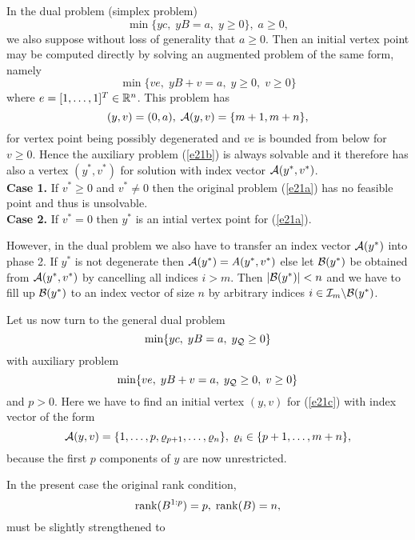 In the dual problem (simplex problem)
\begin{equation} \label{e21a}
\min\{yc, \; yB = a, \; y \geq 0\}, \; a \geq 0,
\end{equation}
we also suppose without loss of generality that $a \geq 0$.  Then an initial
vertex point may be computed directly by solving an augmented problem of the
same form, namely
%
\begin{equation} \label{e21b}
\min \{ve, \; yB + v = a, \; y \geq 0, \; v \geq 0\}
\end{equation}
%
where $e = [1, \ldots , 1]^T \in \Bbb{R}^n$.  This problem has
\[
(y,v) = (0,a), \; {\cal A}(y,v) = \{m+1,m+n\},
\]
for vertex point being possibly degenerated and $ve$ is bounded from
below for $v \geq 0$.  Hence the auxiliary problem (\ref{e21b}) is always
solvable and it therefore has also a vertex $(y^*,v^*)$ for solution
with index vector ${\cal A}(y^*,v^*)$.\\
%
{\bf Case 1.} If $v^* \geq 0$ and $v^* \neq 0$ then the original problem
(\ref{e21a}) has no feasible point and thus is unsolvable.\\
%
{\bf Case 2.} If $v^* = 0$ then $y^*$ is an intial vertex point for
(\ref{e21a}).
\par
However, in the dual problem we also have to transfer an index vector ${\cal A}(y^*)$
into phase 2.  If $y^*$ is not degenerate then ${\cal A}(y^*) =  A(y^*,v^*)$ else let
${\cal B}(y^*)$ be obtained from ${\cal A}(y^*,v^*)$ by cancelling all indices $i > m$.
Then $|{\cal B}(y^*)| < n$ and we have to fill up ${\cal B}(y^*)$ to an index vector of
size $n$ by arbitrary indices $i \in {\cal I}_m \backslash {\cal B}(y^*)$.
\par
Let us now turn to the general dual problem
%
\begin{equation} \label{e21c}
\min\{yc, \; yB = a, \; y_{{\cal Q}} \geq 0\}
\end{equation}
with auxiliary problem
%
\begin{equation} \label{e21d}
\min \{ve, \; yB + v = a, \; y_{{\cal Q}} \geq 0, \; v \geq 0\}
\end{equation}
%
and $p > 0$.  Here
we have to find an initial vertex $(y,v)$ for (\ref{e21c}) with index
vector of the form
\[
{\cal A}(y,v) = \{1,\ldots,p,\varrho _{p+1},\ldots,\varrho _n\}
, \; \varrho _i \in \{p+1, \ldots, m+n\},
\]
because the first $p$ components of $y$ are now unrestricted.
\par
In the present case the original rank condition,
\[
\mathop{\rm rank}\nolimits (B^{1:p}) = p, \; \mathop{\rm rank}\nolimits(B) = n,
\]
must be slightly strengthened to
